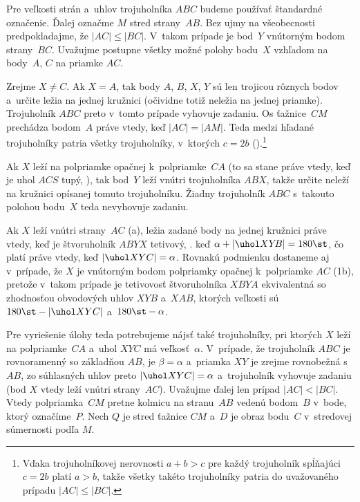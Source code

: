 {%
Pre veľkosti strán a~uhlov trojuholníka $ABC$ budeme používať štandardné označenie. Ďalej označme $M$ stred strany~$AB$. Bez ujmy na všeobecnosti predpokladajme, že $|AC|\le|BC|$. V~takom prípade je bod~$Y$ vnútorným bodom strany~$BC$. Uvažujme postupne všetky možné polohy bodu~$X$ vzhľadom na body~$A$, $C$ na priamke $AC$.

Zrejme $X\ne C$. Ak $X=A$, tak body $A$, $B$, $X$, $Y$ sú len trojicou rôznych bodov a~určite ležia na jednej kružnici (očividne totiž neležia na jednej priamke). Trojuholník $ABC$ preto v~tomto prípade vyhovuje zadaniu. Os ťažnice~$CM$ prechádza bodom~$A$ práve vtedy, keď $|AC|=|AM|$. Teda medzi hľadané trojuholníky patria všetky trojuholníky, v~ktorých $c=2b$ (\obr).\footnote{Vďaka trojuholníkovej nerovnosti $a+b>c$ pre každý trojuholník spĺňajúci $c=2b$ platí $a>b$, takže všetky takéto trojuholníky patria do uvažovaného prípadu $|AC|\le|BC|$.}
%

Ak $X$ leží na polpriamke opačnej k~polpriamke~$CA$ (to sa stane práve vtedy, keď je uhol $ACS$ tupý, \obr), tak bod~$Y$ leží vnútri trojuholníka $ABX$, takže určite neleží na kružnici opísanej tomuto trojuholníku. Žiadny trojuholník $ABC$ s~takouto polohou bodu~$X$ teda nevyhovuje zadaniu.

Ak $X$ leží vnútri strany~$AC$ (\obr{}a), ležia zadané body na jednej kružnici práve vtedy, keď je štvoruholník $ABY\!X$ tetivový, \tj. keď $\alpha+|\uhol XY\!B|=180\st$, čo platí práve vtedy, keď $|\uhol XYC|=\alpha$. Rovnakú podmienku dostaneme aj v~prípade, že $X$ je vnútorným bodom polpriamky opačnej k~polpriamke $AC$ (\obrr1b), pretože v~takom prípade je tetivovosť štvoruholníka $X\!BY\!\!A$ ekvivalentná so zhodnosťou obvodových uhlov $XY\!B$ a~$X\!AB$, ktorých veľkosti sú $180\st-|\uhol XYC|$ a~$180\st-\alpha$.
%

Pre vyriešenie úlohy teda potrebujeme nájsť také trojuholníky, pri ktorých $X$ leží na polpriamke~$CA$ a~uhol $XYC$ má veľkosť~$\alpha$. V~prípade, že trojuholník $ABC$ je rovnoramenný so základňou $AB$, je $\beta=\alpha$ a~priamka $XY$ je zrejme rovnobežná s~$AB$, zo súhlasných uhlov preto $|\uhol XYC|=\alpha$ a~trojuholník vyhovuje zadaniu (bod $X$ vtedy leží vnútri strany~$AC$). Uvažujme ďalej len prípad $|AC|<|BC|$. Vtedy polpriamka~$CM$ pretne kolmicu na stranu~$AB$ vedenú bodom~$B$ v~bode, ktorý označíme~$P$. Nech $Q$ je stred ťažnice $CM$ a~$D$ je obraz bodu~$C$ v~stredovej súmernosti podľa $M$.
%

}
